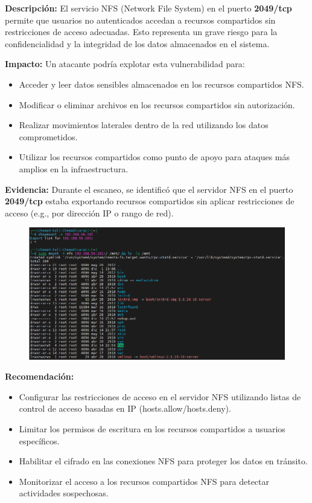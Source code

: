 \documentclass[11pt,oneside,a4paper]{book}
\begin{document}
\textbf{Descripción:}  
El servicio NFS (Network File System) en el puerto \textbf{2049/tcp} permite que usuarios no autenticados accedan a recursos compartidos sin restricciones de acceso adecuadas. Esto representa un grave riesgo para la confidencialidad y la integridad de los datos almacenados en el sistema.

\textbf{Impacto:}  
Un atacante podría explotar esta vulnerabilidad para:
\begin{itemize}
    \item Acceder y leer datos sensibles almacenados en los recursos compartidos NFS.
    \item Modificar o eliminar archivos en los recursos compartidos sin autorización.
    \item Realizar movimientos laterales dentro de la red utilizando los datos comprometidos.
    \item Utilizar los recursos compartidos como punto de apoyo para ataques más amplios en la infraestructura.
\end{itemize}

\textbf{Evidencia:}  
Durante el escaneo, se identificó que el servidor NFS en el puerto \textbf{2049/tcp} estaba exportando recursos compartidos sin aplicar restricciones de acceso (e.g., por dirección IP o rango de red).
\begin{figure}[H]
    \centering
    \includegraphics[width=0.5\linewidth]{img/nfs.png}
\end{figure}

\textbf{Recomendación:}  
\begin{itemize}
    \item Configurar las restricciones de acceso en el servidor NFS utilizando listas de control de acceso basadas en IP (hosts.allow/hosts.deny).
    \item Limitar los permisos de escritura en los recursos compartidos a usuarios específicos.
    \item Habilitar el cifrado en las conexiones NFS para proteger los datos en tránsito.
    \item Monitorizar el acceso a los recursos compartidos NFS para detectar actividades sospechosas.
\end{itemize}
\end{document}
